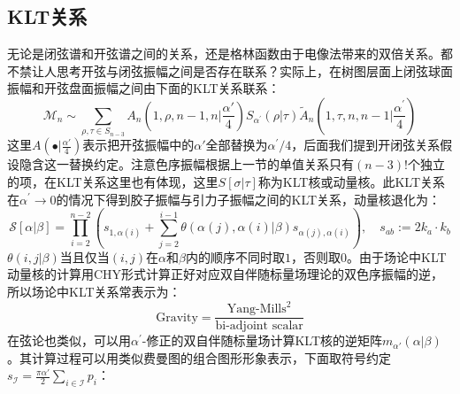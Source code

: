 \subsection{KLT关系}
无论是闭弦谱和开弦谱之间的关系，还是格林函数由于电像法带来的双倍关系。都不禁让人思考开弦与闭弦振幅之间是否存在联系？实际上，在树图层面上闭弦球面振幅和开弦盘面振幅之间由下面的KLT关系联系：
\begin{equation}
	\mathcal{M}_n\sim\sum_{\rho,\tau\in S_{n-3}}A_n\left(1,\rho,n-1,n|\frac{\alpha'}{4}\right)S_{\alpha^{\prime}}(\rho|\tau)\tilde A_n\left(1,\tau,n,n-1|\frac{\alpha^\prime}{4}\right)
\end{equation}
这里$A(\bullet|\frac{\alpha\prime}{4})$表示把开弦振幅中的$\alpha\prime$全部替换为$\alpha^\prime/4$，后面我们提到开闭弦关系假设隐含这一替换约定。注意色序振幅根据上一节的单值关系只有$(n-3)!$个独立的项，在KLT关系这里也有体现，这里$S[\sigma|\tau]$称为KLT核或动量核。此KLT关系在$\alpha^\prime\to 0$的情况下得到胶子振幅与引力子振幅之间的KLT关系，动量核退化为：
\begin{equation}
	\mathcal{S}[\alpha|\beta]=\prod_{i=2}^{n-2}\left(s_{1,\alpha(i)}+\sum_{j=2}^{i-1}\theta(\alpha(j),\alpha(i)|\beta) s_{\alpha(j),\alpha(i)}\right),\quad s_{ab}:=2k_a\cdot k_b
\end{equation}
$\theta\left(i,j|\beta\right)$当且仅当$(i,j)$在$\alpha$和$\beta$内的顺序不同时取$1$，否则取$0$。由于场论中KLT动量核的计算用CHY形式计算正好对应双自伴随标量场理论的双色序振幅的逆\cite{Cachazo:2013gna,Cachazo:2013iea,Cachazo:2013hca}，所以场论中KLT关系常表示为：
\begin{equation*}
	\text{Gravity}=\frac{\text{Yang-Mills}^2}{\text{bi-adjoint scalar}}
\end{equation*}
在弦论也类似，可以用$\alpha^\prime$-修正的双自伴随标量场计算KLT核的逆矩阵$m_{\alpha'}(\alpha|\beta)$\cite{Mizera:2016jhj,Mizera:2017cqs,Massidda:2024krv}。其计算过程可以用类似费曼图的组合图形形象表示，下面取符号约定$s_{\mathcal{I}}=\frac{\pi\alpha'}{2}\sum_{i\in\mathcal{I}}p_i$：

